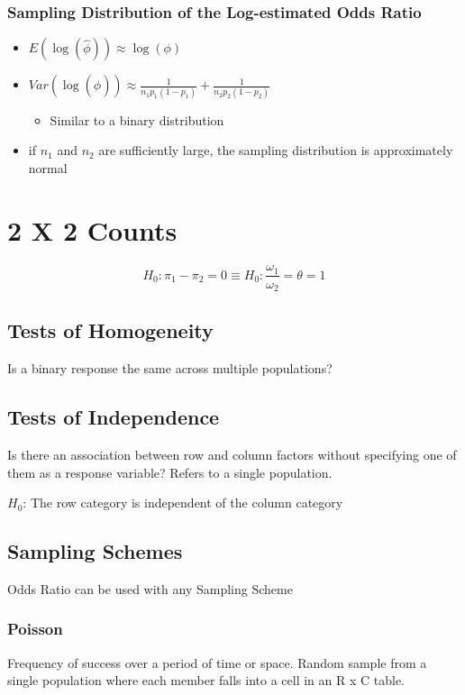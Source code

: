 \documentclass[11pt]{article}
\begin{document}
\subsubsection{Sampling Distribution of the Log-estimated Odds Ratio}
\label{sec:org71c7e07}
\begin{itemize}
\item \(E(\log(\hat{\phi})) \approx \log(\phi)\)
\item \(Var(\log(\hat{\phi})) \approx \frac{1}{n_1 p_1 (1 - p_1)} + \frac{1}{n_2 p_2 (1 - p_2)}\)

\begin{itemize}
\item Similar to a binary distribution
\end{itemize}

\item if \(n_1\) and \(n_2\) are sufficiently large, the sampling distribution
is approximately normal
\end{itemize}

\section{2 X 2 Counts}
\label{sec:org75e4695}
$$
    H_0: \pi_1 - \pi_2 = 0 \equiv H_0: \frac{\omega_1}{\omega_2} = \theta = 1
$$

\subsection{Tests of Homogeneity}
\label{sec:orgfa947ce}
Is a binary response the same across multiple populations?

\subsection{Tests of Independence}
\label{sec:org663852d}
Is there an association between row and column factors without
specifying one of them as a response variable? Refers to a single
population.

\(H_0\): The row category is independent of the column category

\subsection{Sampling Schemes}
\label{sec:org22910e7}
Odds Ratio can be used with any Sampling Scheme

\subsubsection{Poisson}
\label{sec:orgb613b8b}
Frequency of success over a period of time or space. Random sample from
a single population where each member falls into a cell in an R x C
table.
\end{document}
